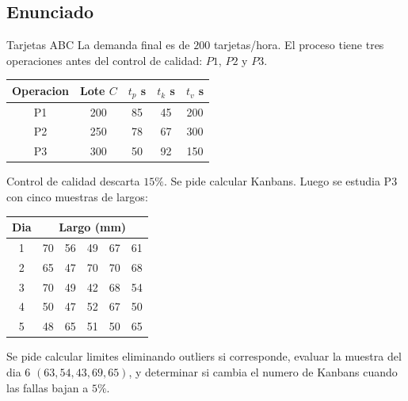 \subsection{Enunciado}

\begin{enunciado}{Tarjetas ABC}
La demanda final es de \(200\) tarjetas/hora. El proceso tiene tres operaciones antes del control de calidad: \(P1\), \(P2\) y \(P3\).

\begin{center}
\begin{tabular}{ccccc}
\toprule
Operacion & Lote \(C\) & \(t_p\) s & \(t_k\) s & \(t_v\) s \\
\midrule
P1 & 200 & 85 & 45 & 200 \\
P2 & 250 & 78 & 67 & 300 \\
P3 & 300 & 50 & 92 & 150 \\
\bottomrule
\end{tabular}
\end{center}

Control de calidad descarta \(15\%\). Se pide calcular Kanbans. Luego se estudia P3 con cinco muestras de largos:

\begin{center}
\begin{tabular}{cccccc}
\toprule
Dia & \multicolumn{5}{c}{Largo (mm)} \\
\midrule
1 & 70 & 56 & 49 & 67 & 61 \\
2 & 65 & 47 & 70 & 70 & 68 \\
3 & 70 & 49 & 42 & 68 & 54 \\
4 & 50 & 47 & 52 & 67 & 50 \\
5 & 48 & 65 & 51 & 50 & 65 \\
\bottomrule
\end{tabular}
\end{center}

Se pide calcular limites eliminando outliers si corresponde, evaluar la muestra del dia 6 \((63,54,43,69,65)\), y determinar si cambia el numero de Kanbans cuando las fallas bajan a \(5\%\).
\end{enunciado}
